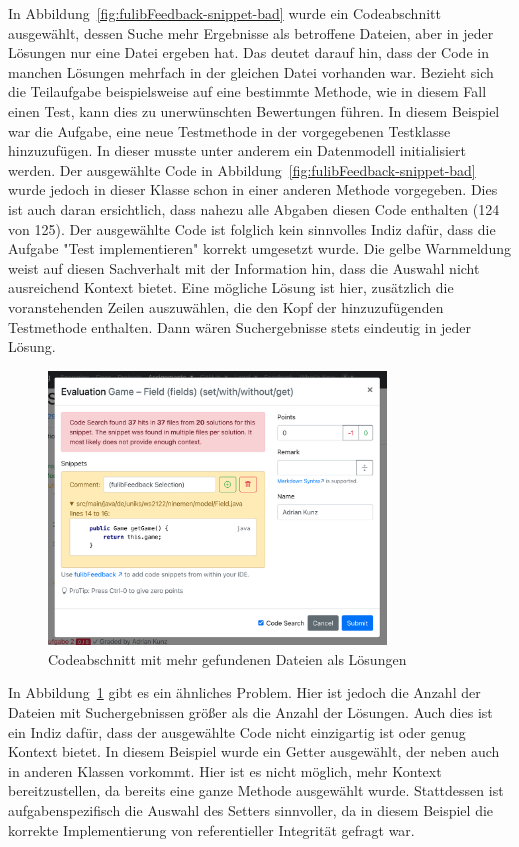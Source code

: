 In Abbildung~\ref{fig:fulibFeedback-snippet-bad} wurde ein Codeabschnitt ausgewählt, dessen Suche mehr Ergebnisse als betroffene Dateien, aber in jeder Lösungen nur eine Datei ergeben hat.
Das deutet darauf hin, dass der Code in manchen Lösungen mehrfach in der gleichen Datei vorhanden war.
Bezieht sich die Teilaufgabe beispielsweise auf eine bestimmte Methode, wie in diesem Fall einen Test, kann dies zu unerwünschten Bewertungen führen.
In diesem Beispiel war die Aufgabe, eine neue Testmethode in der vorgegebenen Testklasse  hinzuzufügen.
In dieser musste unter anderem ein Datenmodell initialisiert werden.
Der ausgewählte Code in Abbildung~\ref{fig:fulibFeedback-snippet-bad} wurde jedoch in dieser Klasse schon in einer anderen Methode vorgegeben.
Dies ist auch daran ersichtlich, dass nahezu alle Abgaben diesen Code enthalten (124 von 125).
Der ausgewählte Code ist folglich kein sinnvolles Indiz dafür, dass die Aufgabe "Test implementieren" korrekt umgesetzt wurde.
Die gelbe Warnmeldung weist auf diesen Sachverhalt mit der Information hin, dass die Auswahl nicht ausreichend Kontext bietet.
Eine mögliche Lösung ist hier, zusätzlich die voranstehenden Zeilen auszuwählen, die den Kopf der hinzuzufügenden Testmethode enthalten.
Dann wären Suchergebnisse stets eindeutig in jeder Lösung.

\begin{figure}
    \centering
    \includegraphics[width=0.8\textwidth]{images/fulibFeedback-snippet-worst}
    \caption{Codeabschnitt mit mehr gefundenen Dateien als Lösungen}
    \label{fig:fulibFeedback-snippet-worst}
\end{figure}

In Abbildung~\ref{fig:fulibFeedback-snippet-worst} gibt es ein ähnliches Problem.
Hier ist jedoch die Anzahl der Dateien mit Suchergebnissen größer als die Anzahl der Lösungen.
Auch dies ist ein Indiz dafür, dass der ausgewählte Code nicht einzigartig ist oder genug Kontext bietet.
In diesem Beispiel wurde ein Getter ausgewählt, der neben  auch in anderen Klassen vorkommt.
Hier ist es nicht möglich, mehr Kontext bereitzustellen, da bereits eine ganze Methode ausgewählt wurde.
Stattdessen ist aufgabenspezifisch die Auswahl des Setters sinnvoller, da in diesem Beispiel die korrekte Implementierung von referentieller Integrität gefragt war.

